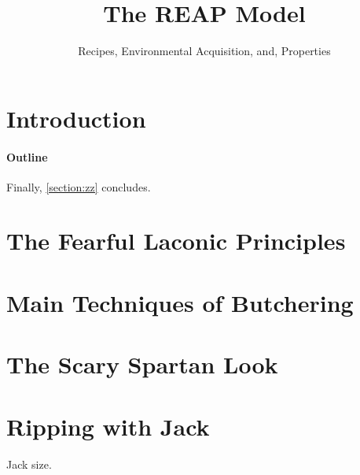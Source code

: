 \documentclass[preprint,10pt,nonatbib]{sigplanconf}
\title{The REAP Model}
\subtitle{Recipes, Environmental Acquisition, and, Properties}
\begin{document}
\maketitle
\eject

\begin{flushright}
  \begin{minipage}{2.5in}
    \normalsize \rmfamily\scshape
    \color{red}{%
      suum cuique \newline
      Tu mortale, essere avvertiti. \newline
      Tu non Shallt Rimuovere \newline
      Questo comandamento \newline
      Mentre ci sono segni di Haste \newline
      in questo documento !!!! \newline
    }
  \end{minipage}
\end{flushright}

\begin{abstract}
  
\end{abstract}
\section{Introduction}


\paragraph{Outline}
Finally, \cref{section:zz} concludes.

\section{The Fearful Laconic Principles}
\label{section:principia}

\section{Main Techniques of Butchering}
\label{section:techniques}

\section{The Scary Spartan Look}
\label{section:look}

\section{Ripping with Jack}
\label{section:jack}
Jack size.
\end{document}
